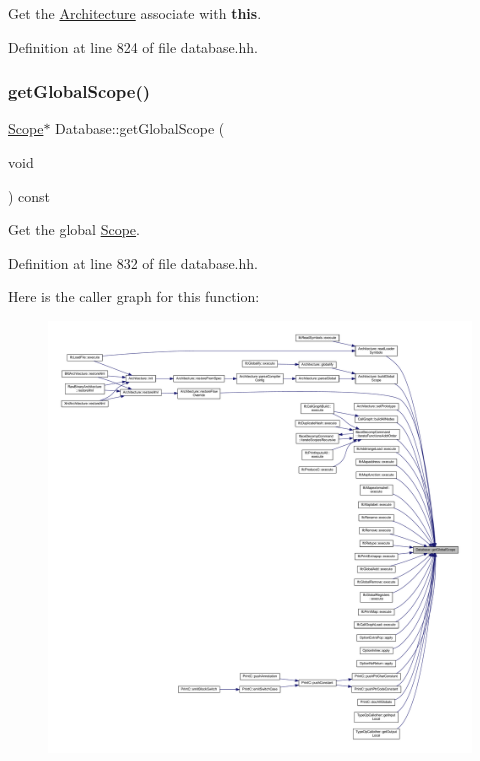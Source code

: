 Get the \mbox{\hyperlink{class_architecture}{Architecture}} associate with {\bfseries{this}}. 



Definition at line 824 of file database.\+hh.

\mbox{\label{class_database_a89703e54c8073c6ab275a1776a7ccd4a}} 
\subsubsection{\texorpdfstring{getGlobalScope()}{getGlobalScope()}}
{\footnotesize\ttfamily \mbox{\hyperlink{class_scope}{Scope}}$\ast$ Database\+::get\+Global\+Scope (\begin{DoxyParamCaption}\item[{void}]{ }\end{DoxyParamCaption}) const\hspace{0.3cm}{\ttfamily [inline]}}



Get the global \mbox{\hyperlink{class_scope}{Scope}}. 



Definition at line 832 of file database.\+hh.

Here is the caller graph for this function\+:
\nopagebreak
\begin{figure}[H]
\begin{center}
\leavevmode
\includegraphics[width=350pt]{class_database_a89703e54c8073c6ab275a1776a7ccd4a_icgraph}
\end{center}
\end{figure}
\mbox{\label{class_database_a56bb739490aaee87bb1cb2849bfdfb53}} 
